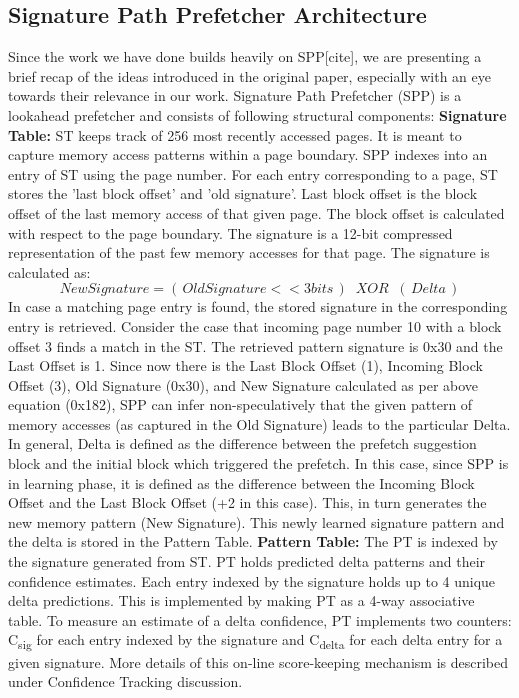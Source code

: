 \documentclass{sig-alternate}
\begin{document}
\subsection{Signature Path Prefetcher Architecture}
Since the work we have done builds heavily on SPP[cite], we are presenting a brief recap of the ideas introduced in the original paper, especially with an eye towards their relevance in our work. Signature Path Prefetcher (SPP) is a lookahead prefetcher and consists of following structural components:
\newline
\newline
\textbf{Signature Table:} ST keeps track of 256 most recently accessed pages. It is meant to capture memory access patterns within a page boundary. SPP indexes into an entry of ST using the page number. For each entry corresponding to a page, ST stores the 'last block offset' and 'old signature'. Last block offset is the block offset of the last memory access of that given page. The block offset is calculated with respect to the page boundary. The signature is a 12-bit compressed representation of the past few memory accesses for that page. The signature is calculated as:
$$New Signature = (\,Old Signature << 3 bits\,) \;\;XOR\;\; (\,Delta\,)$$ 
In case a matching page entry is found, the stored signature in the corresponding entry is retrieved.
\newline
\newline
Consider the case that incoming page number 10 with a block offset 3 finds a match in the ST. The retrieved pattern signature is 0x30 and the Last Offset is 1. Since now there is the Last Block Offset (1), Incoming Block Offset (3), Old Signature (0x30), and New Signature calculated as per above equation (0x182), SPP can infer non-speculatively that the given pattern of memory accesses (as captured in the Old Signature) leads to the particular Delta. In general, Delta is defined as the difference between the prefetch suggestion block and the initial block which triggered the prefetch. In this case, since SPP is in learning phase, it is defined as the difference between the Incoming Block Offset and the Last Block Offset (+2 in this case). This, in turn generates the new memory pattern (New Signature). This newly learned signature pattern and the delta is stored in the Pattern Table.
\newline
\newline
\textbf{Pattern Table:} The PT is indexed by the signature generated from ST. PT holds predicted delta patterns and their confidence estimates. Each entry indexed by the signature holds up to 4 unique delta predictions. This is implemented by making PT as a 4-way associative table. To measure an estimate of a delta confidence, PT implements two counters: C\textsubscript{sig} for each entry indexed by the signature and C\textsubscript{delta} for each delta entry for a given signature. More details of this on-line score-keeping mechanism is described under Confidence Tracking discussion.
\end{document}
